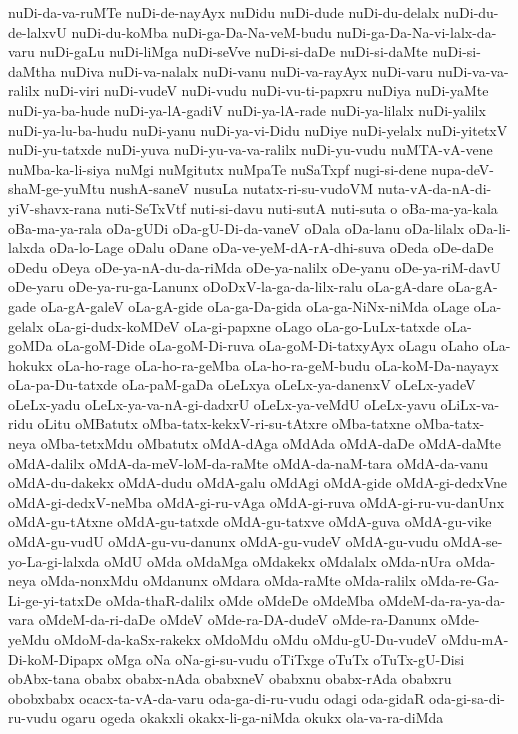{nuDi-da-va-ruMTe
nuDi-de-nayAyx
nuDidu
nuDi-dude
nuDi-du-delalx
nuDi-du-de-lalxvU
nuDi-du-koMba
nuDi-ga-Da-Na-veM-budu
nuDi-ga-Da-Na-vi-lalx-da-varu
nuDi-gaLu
nuDi-liMga
nuDi-seVve
nuDi-si-daDe
nuDi-si-daMte
nuDi-si-daMtha
nuDiva
nuDi-va-nalalx
nuDi-vanu
nuDi-va-rayAyx
nuDi-varu
nuDi-va-va-ralilx
nuDi-viri
nuDi-vudeV
nuDi-vudu
nuDi-vu-ti-papxru
nuDiya
nuDi-yaMte
nuDi-ya-ba-hude
nuDi-ya-lA-gadiV
nuDi-ya-lA-rade
nuDi-ya-lilalx
nuDi-yalilx
nuDi-ya-lu-ba-hudu
nuDi-yanu
nuDi-ya-vi-Didu
nuDiye
nuDi-yelalx
nuDi-yitetxV
nuDi-yu-tatxde
nuDi-yuva
nuDi-yu-va-va-ralilx
nuDi-yu-vudu
nuMTA-vA-vene
nuMba-ka-li-siya
nuMgi
nuMgitutx
nuMpaTe
nuSaTxpf
nugi-si-dene
nupa-deV-shaM-ge-yuMtu
nushA-saneV
nusuLa
nutatx-ri-su-vudoVM
nuta-vA-da-nA-di-yiV-shavx-rana
nuti-SeTxVtf
nuti-si-davu
nuti-sutA
nuti-suta
o
oBa-ma-ya-kala
oBa-ma-ya-rala
oDa-gUDi
oDa-gU-Di-da-vaneV
oDala
oDa-lanu
oDa-lilalx
oDa-li-lalxda
oDa-lo-Lage
oDalu
oDane
oDa-ve-yeM-dA-rA-dhi-suva
oDeda
oDe-daDe
oDedu
oDeya
oDe-ya-nA-du-da-riMda
oDe-ya-nalilx
oDe-yanu
oDe-ya-riM-davU
oDe-yaru
oDe-ya-ru-ga-Lanunx
oDoDxV-la-ga-da-lilx-ralu
oLa-gA-dare
oLa-gA-gade
oLa-gA-galeV
oLa-gA-gide
oLa-ga-Da-gida
oLa-ga-NiNx-niMda
oLage
oLa-gelalx
oLa-gi-dudx-koMDeV
oLa-gi-papxne
oLago
oLa-go-LuLx-tatxde
oLa-goMDa
oLa-goM-Dide
oLa-goM-Di-ruva
oLa-goM-Di-tatxyAyx
oLagu
oLaho
oLa-hokukx
oLa-ho-rage
oLa-ho-ra-geMba
oLa-ho-ra-geM-budu
oLa-koM-Da-nayayx
oLa-pa-Du-tatxde
oLa-paM-gaDa
oLeLxya
oLeLx-ya-danenxV
oLeLx-yadeV
oLeLx-yadu
oLeLx-ya-va-nA-gi-dadxrU
oLeLx-ya-veMdU
oLeLx-yavu
oLiLx-va-ridu
oLitu
oMBatutx
oMba-tatx-kekxV-ri-su-tAtxre
oMba-tatxne
oMba-tatx-neya
oMba-tetxMdu
oMbatutx
oMdA-dAga
oMdAda
oMdA-daDe
oMdA-daMte
oMdA-dalilx
oMdA-da-meV-loM-da-raMte
oMdA-da-naM-tara
oMdA-da-vanu
oMdA-du-dakekx
oMdA-dudu
oMdA-galu
oMdAgi
oMdA-gide
oMdA-gi-dedxVne
oMdA-gi-dedxV-neMba
oMdA-gi-ru-vAga
oMdA-gi-ruva
oMdA-gi-ru-vu-danUnx
oMdA-gu-tAtxne
oMdA-gu-tatxde
oMdA-gu-tatxve
oMdA-guva
oMdA-gu-vike
oMdA-gu-vudU
oMdA-gu-vu-danunx
oMdA-gu-vudeV
oMdA-gu-vudu
oMdA-se-yo-La-gi-lalxda
oMdU
oMda
oMdaMga
oMdakekx
oMdalalx
oMda-nUra
oMda-neya
oMda-nonxMdu
oMdanunx
oMdara
oMda-raMte
oMda-ralilx
oMda-re-Ga-Li-ge-yi-tatxDe
oMda-thaR-dalilx
oMde
oMdeDe
oMdeMba
oMdeM-da-ra-ya-da-vara
oMdeM-da-ri-daDe
oMdeV
oMde-ra-DA-dudeV
oMde-ra-Danunx
oMde-yeMdu
oMdoM-da-kaSx-rakekx
oMdoMdu
oMdu
oMdu-gU-Du-vudeV
oMdu-mA-Di-koM-Dipapx
oMga
oNa
oNa-gi-su-vudu
oTiTxge
oTuTx
oTuTx-gU-Disi
obAbx-tana
obabx
obabx-nAda
obabxneV
obabxnu
obabx-rAda
obabxru
obobxbabx
ocacx-ta-vA-da-varu
oda-ga-di-ru-vudu
odagi
oda-gidaR
oda-gi-sa-di-ru-vudu
ogaru
ogeda
okakxli
okakx-li-ga-niMda
okukx
ola-va-ra-diMda
}
